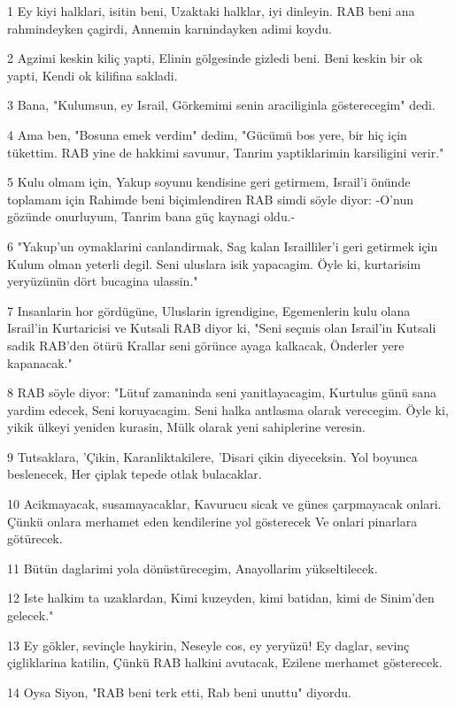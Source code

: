 \par 1 Ey kiyi halklari, isitin beni, Uzaktaki halklar, iyi dinleyin. RAB beni ana rahmindeyken çagirdi, Annemin karnindayken adimi koydu.
\par 2 Agzimi keskin kiliç yapti, Elinin gölgesinde gizledi beni. Beni keskin bir ok yapti, Kendi ok kilifina sakladi.
\par 3 Bana, "Kulumsun, ey Israil, Görkemimi senin araciliginla gösterecegim" dedi.
\par 4 Ama ben, "Bosuna emek verdim" dedim, "Gücümü bos yere, bir hiç için tükettim. RAB yine de hakkimi savunur, Tanrim yaptiklarimin karsiligini verir."
\par 5 Kulu olmam için, Yakup soyunu kendisine geri getirmem, Israil'i önünde toplamam için Rahimde beni biçimlendiren RAB simdi söyle diyor: -O'nun gözünde onurluyum, Tanrim bana güç kaynagi oldu.-
\par 6 "Yakup'un oymaklarini canlandirmak, Sag kalan Israilliler'i geri getirmek için Kulum olman yeterli degil. Seni uluslara isik yapacagim. Öyle ki, kurtarisim yeryüzünün dört bucagina ulassin."
\par 7 Insanlarin hor gördügüne, Uluslarin igrendigine, Egemenlerin kulu olana Israil'in Kurtaricisi ve Kutsali RAB diyor ki, "Seni seçmis olan Israil'in Kutsali sadik RAB'den ötürü Krallar seni görünce ayaga kalkacak, Önderler yere kapanacak."
\par 8 RAB söyle diyor: "Lütuf zamaninda seni yanitlayacagim, Kurtulus günü sana yardim edecek, Seni koruyacagim. Seni halka antlasma olarak verecegim. Öyle ki, yikik ülkeyi yeniden kurasin, Mülk olarak yeni sahiplerine veresin.
\par 9 Tutsaklara, 'Çikin, Karanliktakilere, 'Disari çikin diyeceksin. Yol boyunca beslenecek, Her çiplak tepede otlak bulacaklar.
\par 10 Acikmayacak, susamayacaklar, Kavurucu sicak ve günes çarpmayacak onlari. Çünkü onlara merhamet eden kendilerine yol gösterecek Ve onlari pinarlara götürecek.
\par 11 Bütün daglarimi yola dönüstürecegim, Anayollarim yükseltilecek.
\par 12 Iste halkim ta uzaklardan, Kimi kuzeyden, kimi batidan, kimi de Sinim'den gelecek."
\par 13 Ey gökler, sevinçle haykirin, Neseyle cos, ey yeryüzü! Ey daglar, sevinç çigliklarina katilin, Çünkü RAB halkini avutacak, Ezilene merhamet gösterecek.
\par 14 Oysa Siyon, "RAB beni terk etti, Rab beni unuttu" diyordu.
